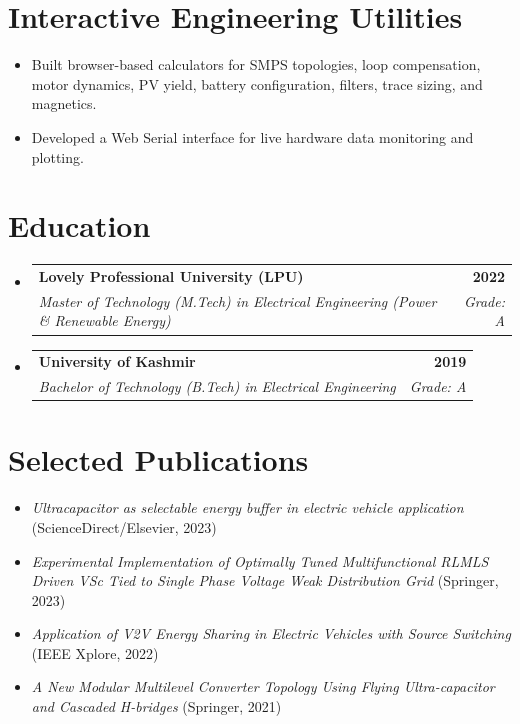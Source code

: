 \documentclass[11pt, a4paper]{article}
\makeatletter
\newcommand{\resumeSubheading}[4]{
  \vspace{0.5ex}\item[]
    \begin{tabular*}{1.0\textwidth}[t]{l@{\extracolsep{\fill}}r}
      \textbf{\color{primary}#1} & \textbf{\color{primary}\small #2} \\
      \textit{\color{muted}\small#3} & \textit{\color{muted}\small #4} \\
    \end{tabular*}\vspace{-0.8ex}
}
\makeatother
\begin{document}
\section*{Interactive Engineering Utilities}
\begin{itemize}[leftmargin=1.5em, itemsep=2pt, topsep=0pt]
    \item \small{Built browser-based calculators for SMPS topologies, loop compensation, motor dynamics, PV yield, battery configuration, filters, trace sizing, and magnetics.}
    \item \small{Developed a Web Serial interface for live hardware data monitoring and plotting.}
\end{itemize}

\section*{Education}
\begin{itemize}[leftmargin=0em, label={}]
    \resumeSubheading
      {Lovely Professional University (LPU)}{2022}
      {Master of Technology (M.Tech) in Electrical Engineering (Power \& Renewable Energy)}{Grade: A}
    \resumeSubheading
      {University of Kashmir}{2019}
      {Bachelor of Technology (B.Tech) in Electrical Engineering}{Grade: A}
\end{itemize}

\section*{Selected Publications}
\begin{itemize}[leftmargin=1.5em, itemsep=2pt, topsep=0pt]
    \item \small{\textit{Ultracapacitor as selectable energy buffer in electric vehicle application} (ScienceDirect/Elsevier, 2023)}
    \item \small{\textit{Experimental Implementation of Optimally Tuned Multifunctional RLMLS Driven VSc Tied to Single Phase Voltage Weak Distribution Grid} (Springer, 2023)}
    \item \small{\textit{Application of V2V Energy Sharing in Electric Vehicles with Source Switching} (IEEE Xplore, 2022)}
    \item \small{\textit{A New Modular Multilevel Converter Topology Using Flying Ultra-capacitor and Cascaded H-bridges} (Springer, 2021)}
\end{itemize}
\end{document}
